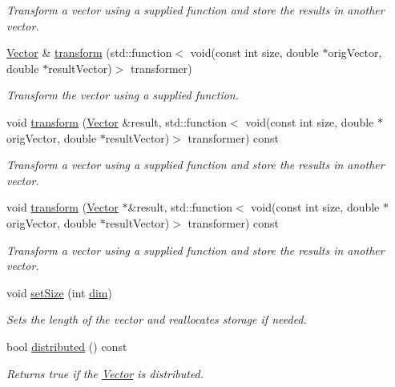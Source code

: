 \begin{DoxyCompactItemize}
\begin{DoxyCompactList}\small\item\em Transform a vector using a supplied function and store the results in another vector. \end{DoxyCompactList}\item 
\hyperlink{class_c_a_r_o_m_1_1_vector}{Vector} \& \hyperlink{class_c_a_r_o_m_1_1_vector_a1476c2143c30c17359156710e0ff2bcb}{transform} (std\-::function$<$ void(const int size, double $\ast$orig\-Vector, double $\ast$result\-Vector)$>$ transformer)
\begin{DoxyCompactList}\small\item\em Transform the vector using a supplied function. \end{DoxyCompactList}\item 
void \hyperlink{class_c_a_r_o_m_1_1_vector_abf85596720840debc2b80e221e658aaa}{transform} (\hyperlink{class_c_a_r_o_m_1_1_vector}{Vector} \&result, std\-::function$<$ void(const int size, double $\ast$orig\-Vector, double $\ast$result\-Vector)$>$ transformer) const 
\begin{DoxyCompactList}\small\item\em Transform a vector using a supplied function and store the results in another vector. \end{DoxyCompactList}\item 
void \hyperlink{class_c_a_r_o_m_1_1_vector_a17c270efb3c8bf59559c8ff774d78e2c}{transform} (\hyperlink{class_c_a_r_o_m_1_1_vector}{Vector} $\ast$\&result, std\-::function$<$ void(const int size, double $\ast$orig\-Vector, double $\ast$result\-Vector)$>$ transformer) const 
\begin{DoxyCompactList}\small\item\em Transform a vector using a supplied function and store the results in another vector. \end{DoxyCompactList}\item 
void \hyperlink{class_c_a_r_o_m_1_1_vector_a1543d65aaadb8016a071a4df9725d366}{set\-Size} (int \hyperlink{class_c_a_r_o_m_1_1_vector_a8f8e5d44c3f2cd12e2f4090ddf97c735}{dim})
\begin{DoxyCompactList}\small\item\em Sets the length of the vector and reallocates storage if needed. \end{DoxyCompactList}\item 
bool \hyperlink{class_c_a_r_o_m_1_1_vector_a0fe8ff4dfdb1357d1bb67f7945491841}{distributed} () const 
\begin{DoxyCompactList}\small\item\em Returns true if the \hyperlink{class_c_a_r_o_m_1_1_vector}{Vector} is distributed. \end{DoxyCompactList}\item 

\end{DoxyCompactItemize}
